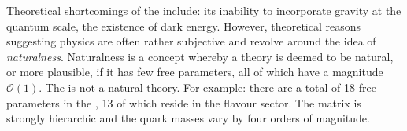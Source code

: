 Theoretical shortcomings of the \sm include: its inability to incorporate gravity at the quantum
scale, the existence of dark energy.
However, theoretical reasons suggesting \bsm physics
are often rather subjective and revolve around the idea of \emph{naturalness}.
Naturalness is a concept whereby a theory is deemed to be natural, or more plausible, if it has few
free parameters, all of which have a magnitude $\mathcal{O}(1)$.
The \sm is not a natural theory.
For example: there are a total of 18 free parameters in the \sm, 13 of which reside in the flavour
sector.
The \ckm matrix is strongly hierarchic
and the quark masses vary by four orders of magnitude.

